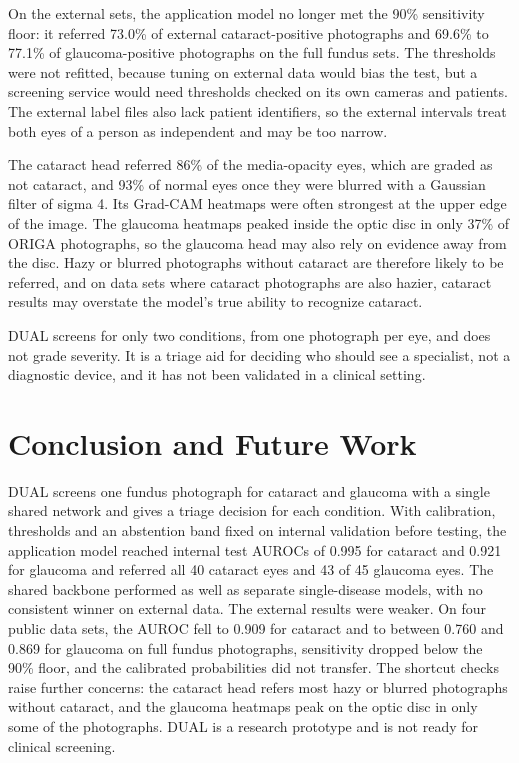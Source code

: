 \documentclass[conference,a4paper]{IEEEtran}
\begin{document}
On the external sets, the application model no longer met the 90\% sensitivity floor: it referred
73.0\% of external cataract-positive photographs and 69.6\% to 77.1\% of glaucoma-positive
photographs on the full fundus sets. The thresholds were not refitted, because tuning on external
data would bias the test, but a screening service would need thresholds checked on its own cameras
and patients. The external label files also lack patient identifiers, so the external intervals
treat both eyes of a person as independent and may be too narrow.

The cataract head referred 86\% of the media-opacity eyes, which are graded as not cataract, and
93\% of normal eyes once they were blurred with a Gaussian filter of sigma 4. Its Grad-CAM heatmaps
were often strongest at the upper edge of the image. The glaucoma heatmaps peaked inside the optic
disc in only 37\% of ORIGA photographs, so the glaucoma head may also rely on evidence away from the
disc. Hazy or blurred photographs without cataract are therefore likely to be referred, and on data
sets where cataract photographs are also hazier, cataract results may overstate the model's true
ability to recognize cataract.

DUAL screens for only two conditions, from one photograph per eye, and does not grade severity. It
is a triage aid for deciding who should see a specialist, not a diagnostic device, and it has not
been validated in a clinical setting.

\section{Conclusion and Future Work}

DUAL screens one fundus photograph for cataract and glaucoma with a single shared network and gives
a triage decision for each condition. With calibration, thresholds and an abstention band fixed on
internal validation before testing, the application model reached internal test AUROCs of 0.995 for
cataract and 0.921 for glaucoma and referred all 40 cataract eyes and 43 of 45 glaucoma eyes. The
shared backbone performed as well as separate single-disease models, with no consistent winner on
external data. The external results were weaker. On four public data sets, the AUROC fell to 0.909
for cataract and to between 0.760 and 0.869 for glaucoma on full fundus photographs, sensitivity
dropped below the 90\% floor, and the calibrated probabilities did not transfer. The shortcut checks
raise further concerns: the cataract head refers most hazy or blurred photographs without cataract,
and the glaucoma heatmaps peak on the optic disc in only some of the photographs. DUAL is a research
prototype and is not ready for clinical screening.
\end{document}
